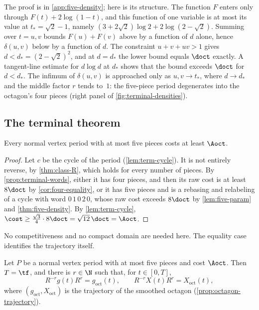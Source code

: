 The proof is in \cref{app:five-density}; here is its structure. The function $F$ enters only
through $F(t)+2\log(1-t)$, and this function of one variable is at most its value at
$t_*=\sqrt2-1$, namely $(3+2\sqrt2)\log2+2\log(2-\sqrt2)$. Summing over
$t=u,v$ bounds $F(u)+F(v)$ above by a function of $d$ alone, hence $\delta(u,v)$ below by a
function of $d$. The constraint $u+v+uv>1$ gives $d<d_*=(2-\sqrt2)^2$, and at $d=d_*$ the lower
bound equals $\doct$ exactly. A tangent-line estimate for $d\log d$ at $d_*$ shows that the bound
exceeds $\doct$ for $d<d_*$. The infimum of $\delta(u,v)$ is approached only as $u,v\to t_*$,
where $d\to d_*$ and the middle factor $r$ tends to~$1$: the five-piece period degenerates into
the octagon's four pieces (right panel of \cref{fig:terminal-densities}).

\subsection{The terminal theorem}\label{sec:terminal-theorem}

\begin{theorem}\label{thm:terminal}
Every normal vertex period with at most five pieces costs at least $\Aoct$.
\end{theorem}

\begin{proof}
Let $c$ be the cycle of the period (\cref{lem:term-cycle}). It is not entirely reverse, by
\cref{thm:class-R}, which holds for every number of pieces. By \cref{prop:terminal-words}, either
it has four pieces, and then its raw cost is at least $8\doct$ by \cref{cor:four-equality}, or it
has five pieces and is a rebasing and relabeling of a cycle with word $0\,1\,0\,2\,0$, whose raw
cost exceeds $8\doct$ by \cref{lem:five-param} and \cref{thm:five-density}. By
\cref{lem:term-cycle},
$\cost\ge\frac{\sqrt3}{4}\cdot8\doct=\sqrt{12}\,\doct=\Aoct$.
\end{proof}

No competitiveness and no compact domain are needed here. The equality case identifies the
trajectory itself.

\begin{proposition}\label{prop:terminal-equality}
Let $P$ be a normal vertex period with at most five pieces and cost $\Aoct$. Then $T=\tf$, and
there is $r\in\N$ such that, for $t\in[0,T]$,
\[
 R^{-r}g(t)R^{r}=g_{\mathrm{oct}}(t),\qquad R^{-r}X(t)R^{r}=X_{\mathrm{oct}}(t),
\]
where $(g_{\mathrm{oct}},X_{\mathrm{oct}})$ is the trajectory of the smoothed octagon
(\cref{prop:octagon-trajectory}).
\end{proposition}


